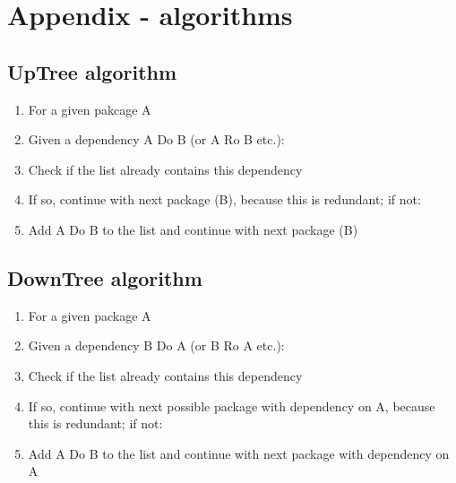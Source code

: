 \newpage

\section{Appendix - algorithms}\label{sec:appendix}

\subsection{UpTree algorithm}\label{sec:uptree}
  \begin{enumerate}
     \item For a given pakcage A
     \item Given a dependency A Do B (or A Ro B etc.):
     \item Check if the list already contains this dependency
     \item If so, continue with next package (B), because this is redundant; if not:
     \item Add A Do B to the list and continue with next package (B)
    \end{enumerate}

\subsection{DownTree algorithm}\label{sec:downtree}
  \begin{enumerate}
     \item For a given package A
     \item Given a dependency B Do A (or B Ro A etc.):
     \item Check if the list already contains this dependency
     \item If so, continue with next possible package with dependency on A, because this is redundant; if not:
     \item Add A Do B to the list and continue with next package with dependency on A
    \end{enumerate}


